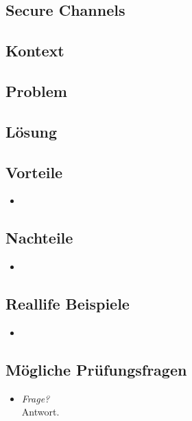 \subsection{Secure Channels}

\subsection*{Kontext}


\subsection*{Problem}


\subsection*{Lösung}


\subsection*{Vorteile}
\begin{itemize}
	\item
\end{itemize}

\subsection*{Nachteile}
\begin{itemize}
	\item
\end{itemize}

\subsection*{Reallife Beispiele}
\begin{itemize}
	\item
\end{itemize}

\subsection*{Mögliche Prüfungsfragen}
\begin{itemize}
	\item \emph{Frage?}\\
	Antwort.
\end{itemize}